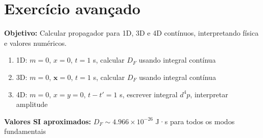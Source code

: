 \documentclass[12pt,a4paper]{article}
\begin{document}
\section{Exercício avançado}
\textbf{Objetivo:} Calcular propagador para 1D, 3D e 4D contínuos, interpretando física e valores numéricos.

\begin{enumerate}
\item 1D: $m=0$, $x=0$, $t=1$ s, calcular $D_F$ usando integral contínua
\item 3D: $m=0$, $\mathbf{x}=0$, $t=1$ s, calcular $D_F$ usando integral contínua
\item 4D: $m=0$, $x=y=0$, $t-t'=1$ s, escrever integral $d^4p$, interpretar amplitude
\end{enumerate}

\textbf{Valores SI aproximados:} $D_F \sim 4.966\times10^{-26}$ J·s para todos os modos fundamentais
\end{document}
